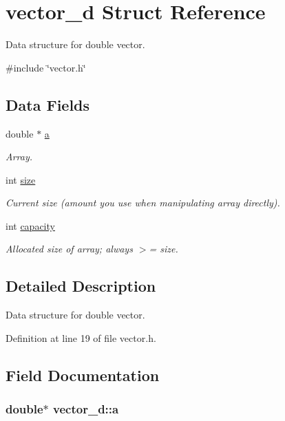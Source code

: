 \hypertarget{structvector__d}{
\section{vector\_\-d Struct Reference}
\label{structvector__d}
}


Data structure for double vector.  




{\ttfamily \#include \char`\"{}vector.h\char`\"{}}

\subsection*{Data Fields}
\begin{DoxyCompactItemize}
\item 
double $\ast$ \hyperlink{structvector__d_a925832a4ece20022fbe241e7e38ec329}{a}
\begin{DoxyCompactList}\small\item\em Array. \item\end{DoxyCompactList}\item 
int \hyperlink{structvector__d_a0267fa83b14889786ec36cdbe78a71b3}{size}
\begin{DoxyCompactList}\small\item\em Current size (amount you use when manipulating array directly). \item\end{DoxyCompactList}\item 
int \hyperlink{structvector__d_acc924985e421a81b7acb5a2ee8eecfaa}{capacity}
\begin{DoxyCompactList}\small\item\em Allocated size of array; always $>$= size. \item\end{DoxyCompactList}\end{DoxyCompactItemize}


\subsection{Detailed Description}
Data structure for double vector. 

Definition at line 19 of file vector.h.



\subsection{Field Documentation}
\hypertarget{structvector__d_a925832a4ece20022fbe241e7e38ec329}{
\subsubsection[{a}]{\setlength{\rightskip}{0pt plus 5cm}double$\ast$ {\bf vector\_\-d::a}}}
\label{structvector__d_a925832a4ece20022fbe241e7e38ec329}



